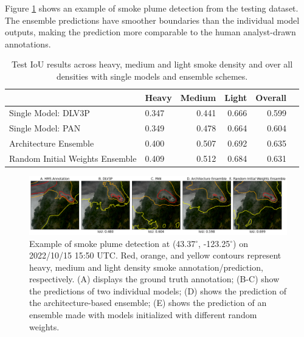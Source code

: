 \documentclass{article}
\begin{document}
Figure \ref{fig:ensemble_panel} shows an example of smoke plume detection from the testing dataset. The ensemble predictions have smoother boundaries than the individual model outputs, making the prediction more comparable to the human analyst-drawn annotations.
\begin{table}[h]
    \centering
    \caption{Test IoU results across heavy, medium and light smoke density and over all densities with single models and ensemble schemes.}
    \label{tab:results}
    \begin{tabular}{llrrr>{\bfseries}r}
        \hline
            &   Heavy &   Medium &   Light &   Overall \\
        \hline
        Single Model: DLV3P \citep{dlv3p} &   0.347 &     0.441 &  0.666 &      0.599  \\
        Single Model: PAN \citep{PAN} &  0.349 &     0.478 &  0.664 &      0.604 \\
        Architecture Ensemble &   0.400 &     0.507 &  0.692 &      0.635 \\ %
        Random Initial Weights Ensemble &  0.409 &     0.512 &  0.684 &      0.631 \\%
         \hline
    \end{tabular}
    \end{table}

\begin{figure}[h]
    \centering
    \includegraphics[width=\textwidth]{ensemble_panel_tinypaper.png}
    \caption{Example of smoke plume detection at (43.37$^{\circ}$, -123.25$^{\circ}$) on 2022/10/15 15:50 UTC. Red, orange, and yellow contours represent heavy, medium and light density smoke annotation/prediction, respectively. (A) displays the ground truth annotation; (B-C) show the predictions of two individual models; (D) shows the prediction of the architecture-based ensemble; (E) shows the prediction of an ensemble made with models initialized with different random weights.}
    \label{fig:ensemble_panel}
\end{figure}
\end{document}

